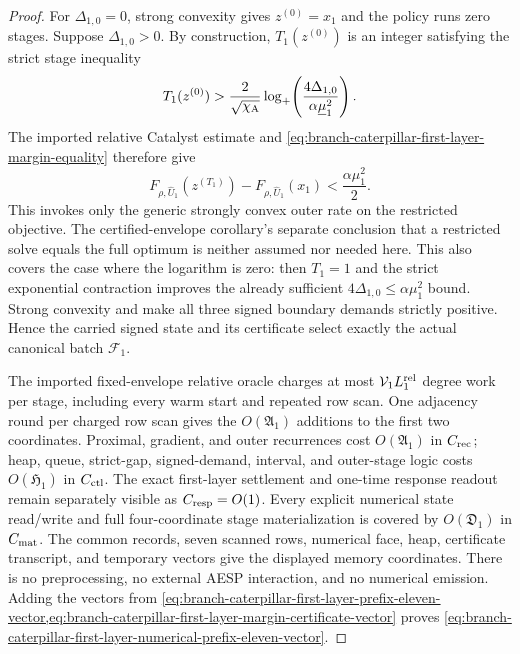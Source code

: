 \begin{proof}
For $\Delta_{1,0}=0$, strong convexity gives $z^{(0)}=x_1$ and the policy runs
zero stages.  Suppose $\Delta_{1,0}>0$.  By construction,
$T_1(z^{(0)})$ is an integer satisfying the strict stage inequality
\begin{equation*}
 T_1(z^{(0)})>
 \frac{2}{\sqrt{\chi_{\rm A}}}
 \log_+\!\left(
  \frac{4\Delta_{1,0}}
       {\alpha\underline\mu_1^2}
             \right).
\end{equation*}
The imported relative Catalyst estimate and
\cref{eq:branch-caterpillar-first-layer-margin-equality} therefore give
\[
 F_{\rho,\widehat U_1}(z^{(T_1)})
 -F_{\rho,\widehat U_1}(x_1)
 <\frac{\alpha\mu_1^2}{2}.
\]
This invokes only the generic strongly convex outer rate on the restricted
objective.  The certified-envelope corollary's separate conclusion that a
restricted solve equals the full optimum is neither assumed nor needed here.
This also covers the case where the logarithm is zero: then $T_1=1$ and the
strict exponential contraction improves the already sufficient
$4\Delta_{1,0}\leq\alpha\mu_1^2$ bound.  Strong convexity and
 make all three signed
boundary demands strictly positive.  Hence the carried signed state and its
certificate select exactly the actual canonical batch $\mathcal F_1$.

The imported fixed-envelope relative oracle charges at most
$\mathcal V_1L_1^{\rm rel}$ degree work per stage, including every warm start
and repeated row scan.  One adjacency round per charged row scan gives the
$O(\mathfrak A_1)$ additions to the first two coordinates.  Proximal,
gradient, and outer recurrences cost $O(\mathfrak A_1)$ in $C_{\rm rec}$;
heap, queue, strict-gap, signed-demand, interval, and outer-stage logic costs
$O(\mathfrak H_1)$ in $C_{\rm ctl}$.  The exact first-layer settlement and
one-time response readout remain separately visible as $C_{\rm resp}=O(1)$.
Every explicit numerical state read/write and full four-coordinate stage
materialization is covered by $O(\mathfrak D_1)$ in $C_{\rm mat}$.  The
common records, seven scanned rows, numerical face, heap, certificate
transcript, and temporary vectors give the displayed memory coordinates.
There is no preprocessing, no external AESP interaction, and no numerical
emission.  Adding the vectors from
\cref{eq:branch-caterpillar-first-layer-prefix-eleven-vector,eq:branch-caterpillar-first-layer-margin-certificate-vector}
proves
\cref{eq:branch-caterpillar-first-layer-numerical-prefix-eleven-vector}.


\end{proof}
